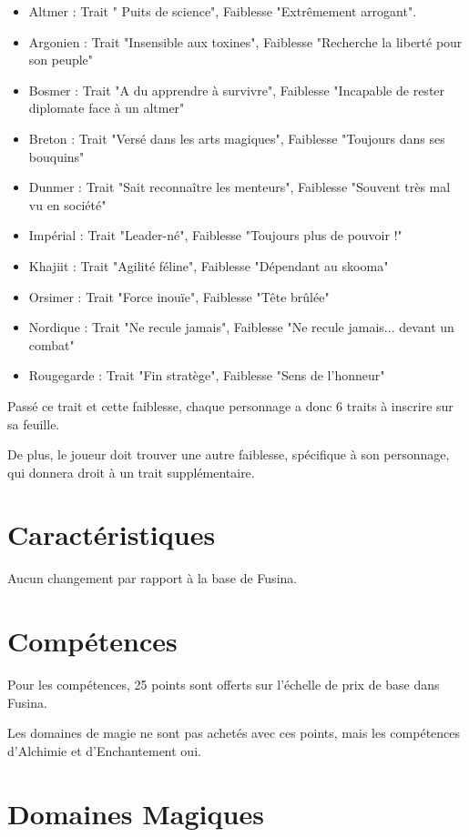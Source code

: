 \begin{itemize}
\item
Altmer : Trait " Puits de science", Faiblesse "Extrêmement arrogant".
\item
Argonien : Trait "Insensible aux toxines", Faiblesse "Recherche la liberté pour son peuple"
\item
Bosmer : Trait "A du apprendre à survivre", Faiblesse "Incapable de rester diplomate face à un altmer"
\item
Breton : Trait "Versé dans les arts magiques", Faiblesse "Toujours dans ses bouquins"
\item
Dunmer : Trait "Sait reconnaître les menteurs", Faiblesse "Souvent très mal vu en société"
\item
Impérial : Trait "Leader-né", Faiblesse "Toujours plus de pouvoir !"
\item
Khajiit : Trait "Agilité féline", Faiblesse "Dépendant au skooma"
\item
Orsimer : Trait "Force inouïe", Faiblesse "Tête brûlée"
\item
Nordique : Trait "Ne recule jamais", Faiblesse "Ne recule jamais... devant un combat"
\item
Rougegarde : Trait "Fin stratège", Faiblesse "Sens de l'honneur"
\end{itemize}

Passé ce trait et cette faiblesse, chaque personnage a donc 6 traits à inscrire sur sa feuille.

De plus, le joueur doit trouver une autre faiblesse, spécifique à son personnage, qui donnera droit à un trait supplémentaire.

\section{Caractéristiques}

Aucun changement par rapport à la base de Fusina.

\section{Compétences}

Pour les compétences, 25 points sont offerts sur l'échelle de prix de base dans Fusina.

Les domaines de magie ne sont pas achetés avec ces points, mais les compétences d'Alchimie et d'Enchantement oui.

\section{Domaines Magiques}

